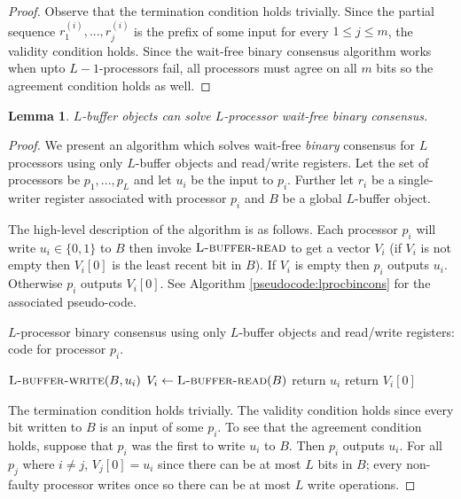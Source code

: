 \documentclass[11pt]{article}
\newcommand\lbufread{\textsc{L-buffer-read}}
\newcommand\lbufwrite{\textsc{L-buffer-write}}
\newtheorem{lemma}[theorem]{Lemma}
\begin{document}
\begin{proof}
Observe that the termination condition holds trivially. Since the partial sequence $r^{(i)}_1, ..., r^{(i)}_j$ is the prefix of some input for every $1 \leq j \leq m$, the validity condition holds. Since the wait-free binary consensus algorithm works when upto $L-1$-processors fail, all processors must agree on all $m$ bits so the agreement condition holds as well. 

\end{proof}

\begin{lemma}
\label{lem:lprocwaitfreebin}
$L$-buffer objects can solve $L$-processor wait-free binary consensus.
\end{lemma}
\begin{proof}
We present an algorithm which solves wait-free \emph{binary} consensus for $L$ processors using only $L$-buffer objects and read/write registers. Let the set of processors be $p_1, ..., p_{L}$ and let $u_i$ be the input to $p_i$. Further let $r_i$ be a single-writer register associated with processor $p_i$ and $B$ be a global $L$-buffer object.

The high-level description of the algorithm is as follows. Each processor $p_i$ will write $u_i \in \{0,1\}$ to $B$ then invoke $\lbufread$ to get a vector $V_i$ (if $V_i$ is not empty then $V_i[0]$ is the least recent bit in $B$). If $V_i$ is empty then $p_i$ outputs $u_i$. Otherwise $p_i$ outputs $V_i[0]$. See Algorithm \ref{pseudocode:lprocbincons} for the associated pseudo-code.

\begin{algorithm}
	\caption{$L$-processor binary consensus using only $L$-buffer objects and read/write registers: code for processor $p_i$.}
    \label{pseudocode:lprocbincons}
    \begin{algorithmic}[1]
	\State $\lbufwrite(B, u_i)$
	\State $V_i \leftarrow \lbufread(B)$
		\State return $u_i$
	\Else
		\State return $V_i[0]$
	\EndIf 
    \end{algorithmic}
\end{algorithm}

The termination condition holds trivially. The validity condition holds since every bit written to $B$ is an input of some $p_i$. To see that the agreement condition holds, suppose that $p_i$ was the first to write $u_i$ to $B$. Then $p_i$ outputs $u_i$. For all $p_j$ where $i \neq j$, $V_j[0] = u_i$ since there can be at most $L$ bits in $B$; every non-faulty processor writes once so there can be at most $L$ write operations.   
\end{proof}
\end{document}
